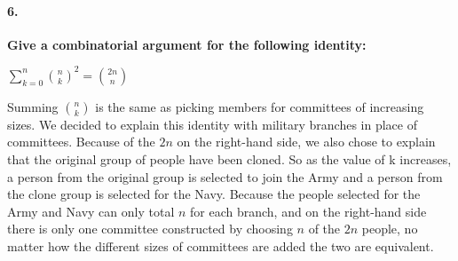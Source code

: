 \documentclass{article}
\begin{document}
\pagebreak

\paragraph{6. }
\textbf{Give a combinatorial argument for the following identity:}
\begin{center}
$\sum\limits_{k=0}^n {n \choose k}^2 = {2n \choose n}$
\end{center}
Summing ${n \choose k}$ is the same as picking members for committees of increasing sizes. We decided to explain this identity with military branches in place of committees. Because of the $2n$ on the right-hand side, we also chose to explain that the original group of people have been cloned. So as the value of k increases, a person from the original group is selected to join the Army and a person from the clone group is selected for the Navy. Because the people selected for the Army and Navy can only total $n$ for each branch, and on the right-hand side there is only one committee constructed by choosing $n$ of the $2n$ people, no matter how the different sizes of committees are added the two are equivalent.
\end{document}
